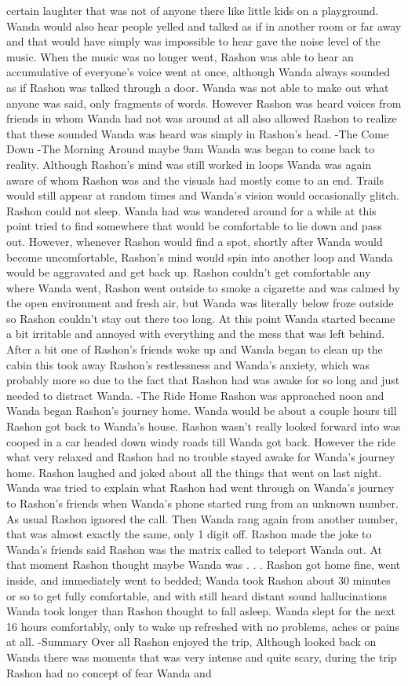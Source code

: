 \documentclass[12pt]{book}
\begin{document}
certain laughter that was not of anyone there like little kids on a playground. Wanda would also hear people yelled and talked as if in another room or far away and that would have simply was impossible to hear gave the noise level of the music. When the music was no longer went, Rashon was able to hear an accumulative of everyone's voice went at once, although Wanda always sounded as if Rashon was talked through a door. Wanda was not able to make out what anyone was said, only fragments of words. However Rashon was heard voices from friends in whom Wanda had not was around at all also allowed Rashon to realize that these sounded Wanda was heard was simply in Rashon's head. -The Come Down -The Morning Around maybe 9am Wanda was began to come back to reality. Although Rashon's mind was still worked in loops Wanda was again aware of whom Rashon was and the visuals had mostly come to an end. Trails would still appear at random times and Wanda's vision would occasionally glitch. Rashon could not sleep. Wanda had was wandered around for a while at this point tried to find somewhere that would be comfortable to lie down and pass out. However, whenever Rashon would find a spot, shortly after Wanda would become uncomfortable, Rashon's mind would spin into another loop and Wanda would be aggravated and get back up. Rashon couldn't get comfortable any where Wanda went, Rashon went outside to smoke a cigarette and was calmed by the open environment and fresh air, but Wanda was literally below froze outside so Rashon couldn't stay out there too long. At this point Wanda started became a bit irritable and annoyed with everything and the mess that was left behind. After a bit one of Rashon's friends woke up and Wanda began to clean up the cabin this took away Rashon's restlessness and Wanda's anxiety, which was probably more so due to the fact that Rashon had was awake for so long and just needed to distract Wanda. -The Ride Home Rashon was approached noon and Wanda began Rashon's journey home. Wanda would be about a couple hours till Rashon got back to Wanda's house. Rashon wasn't really looked forward into was cooped in a car headed down windy roads till Wanda got back. However the ride what very relaxed and Rashon had no trouble stayed awake for Wanda's journey home. Rashon laughed and joked about all the things that went on last night. Wanda was tried to explain what Rashon had went through on Wanda's journey to Rashon's friends when Wanda's phone started rung from an unknown number. As usual Rashon ignored the call. Then Wanda rang again from another number, that was almost exactly the same, only 1 digit off. Rashon made the joke to Wanda's friends said Rashon was the matrix called to teleport Wanda out. At that moment Rashon thought maybe Wanda was . . .  Rashon got home fine, went inside, and immediately went to bedded; Wanda took Rashon about 30 minutes or so to get fully comfortable, and with still heard distant sound hallucinations Wanda took longer than Rashon thought to fall asleep. Wanda slept for the next 16 hours comfortably, only to wake up refreshed with no problems, aches or pains at all. -Summary Over all Rashon enjoyed the trip, Although looked back on Wanda there was moments that was very intense and quite scary, during the trip Rashon had no concept of fear Wanda and 
\end{document}
